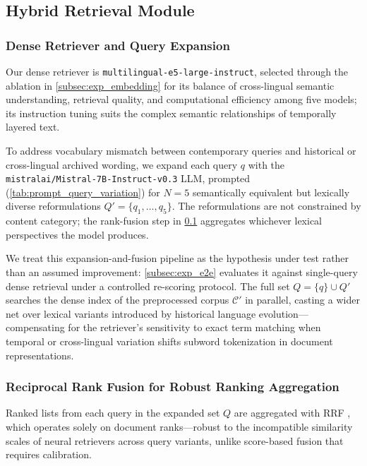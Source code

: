 \documentclass[11pt]{article}
\begin{document}
\subsection{Hybrid Retrieval Module}
\label{subsec:retrieval}

\subsubsection{Dense Retriever and Query Expansion}
Our dense retriever is \texttt{multilingual-e5-large-instruct}, selected through the ablation in \cref{subsec:exp_embedding} for its balance of cross-lingual semantic understanding, retrieval quality, and computational efficiency among five models; its instruction tuning suits the complex semantic relationships of temporally layered text.

To address vocabulary mismatch between contemporary queries and historical or cross-lingual archived wording, we expand each query \(q\) with the \texttt{mistralai/Mistral-7B-Instruct-v0.3} LLM, prompted (\cref{tab:prompt_query_variation}) for \(N=5\) semantically equivalent but lexically diverse reformulations \(Q' = \{q_1, \ldots, q_5\}\). The reformulations are not constrained by content category; the rank-fusion step in \cref{subsec:retrieval} aggregates whichever lexical perspectives the model produces.

We treat this expansion-and-fusion pipeline as the hypothesis under test rather than an assumed improvement: \cref{subsec:exp_e2e} evaluates it against single-query dense retrieval under a controlled re-scoring protocol. The full set \(Q = \{q\} \cup Q'\) searches the dense index of the preprocessed corpus \(\mathcal{C}'\) in parallel, casting a wider net over lexical variants introduced by historical language evolution---compensating for the retriever's sensitivity to exact term matching when temporal or cross-lingual variation shifts subword tokenization in document representations.

\subsubsection{Reciprocal Rank Fusion for Robust Ranking Aggregation}
Ranked lists from each query in the expanded set \(Q\) are aggregated with RRF \citep{10.1145/1571941.1572114}, which operates solely on document ranks---robust to the incompatible similarity scales of neural retrievers across query variants, unlike score-based fusion that requires calibration.
\end{document}
